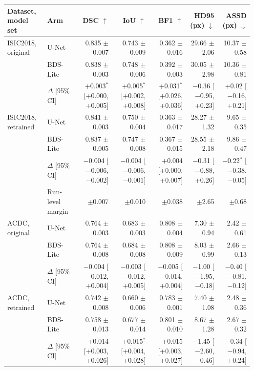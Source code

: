 \begin{tabular}{llrrrrr}
\toprule
Dataset, model set & Arm & DSC $\uparrow$ & IoU $\uparrow$ & BF1 $\uparrow$ & HD95 (px) $\downarrow$ & ASSD (px) $\downarrow$ \\
\midrule
ISIC2018, original & U-Net & 0.835 $\pm$ 0.007 & 0.743 $\pm$ 0.009 & 0.362 $\pm$ 0.016 & 29.66 $\pm$ 2.06 & 10.37 $\pm$ 0.58 \\
 & BDS-Lite & 0.838 $\pm$ 0.003 & 0.748 $\pm$ 0.006 & 0.392 $\pm$ 0.003 & 30.05 $\pm$ 2.98 & 10.36 $\pm$ 0.81 \\
 & $\Delta$ [95\% CI] & +0.003$^{*}$ [+0.000, +0.005] & +0.005$^{*}$ [+0.002, +0.008] & +0.031$^{*}$ [+0.026, +0.036] & $-$0.36 [$-$0.95, +0.23] & +0.02 [$-$0.16, +0.21] \\
\addlinespace
ISIC2018, retrained & U-Net & 0.841 $\pm$ 0.003 & 0.750 $\pm$ 0.004 & 0.363 $\pm$ 0.017 & 28.27 $\pm$ 1.32 & 9.65 $\pm$ 0.35 \\
 & BDS-Lite & 0.837 $\pm$ 0.005 & 0.747 $\pm$ 0.008 & 0.367 $\pm$ 0.015 & 28.55 $\pm$ 2.18 & 9.86 $\pm$ 0.47 \\
 & $\Delta$ [95\% CI] & $-$0.004 [$-$0.006, $-$0.002] & $-$0.004 [$-$0.006, $-$0.001] & +0.004 [+0.000, +0.007] & $-$0.31 [$-$0.88, +0.26] & $-$0.22$^{*}$ [$-$0.38, $-$0.05] \\
\addlinespace
 & Run-level margin & $\pm$0.007 & $\pm$0.010 & $\pm$0.038 & $\pm$2.65 & $\pm$0.68 \\
\midrule
ACDC, original & U-Net & 0.764 $\pm$ 0.003 & 0.683 $\pm$ 0.003 & 0.808 $\pm$ 0.004 & 7.30 $\pm$ 0.94 & 2.42 $\pm$ 0.61 \\
 & BDS-Lite & 0.764 $\pm$ 0.008 & 0.684 $\pm$ 0.008 & 0.808 $\pm$ 0.009 & 8.03 $\pm$ 0.99 & 2.66 $\pm$ 0.13 \\
 & $\Delta$ [95\% CI] & $-$0.004 [$-$0.012, +0.004] & $-$0.003 [$-$0.012, +0.005] & $-$0.005 [$-$0.014, +0.004] & $-$1.00 [$-$1.95, $-$0.18] & $-$0.40 [$-$0.81, $-$0.12] \\
\addlinespace
ACDC, retrained & U-Net & 0.742 $\pm$ 0.008 & 0.660 $\pm$ 0.006 & 0.783 $\pm$ 0.001 & 7.40 $\pm$ 1.08 & 2.48 $\pm$ 0.36 \\
 & BDS-Lite & 0.758 $\pm$ 0.013 & 0.677 $\pm$ 0.014 & 0.801 $\pm$ 0.010 & 8.67 $\pm$ 1.28 & 2.67 $\pm$ 0.32 \\
 & $\Delta$ [95\% CI] & +0.014 [+0.003, +0.026] & +0.015$^{*}$ [+0.004, +0.028] & +0.015 [+0.003, +0.027] & $-$1.45 [$-$2.60, $-$0.46] & $-$0.34 [$-$0.94, +0.24] \\

\end{tabular}
